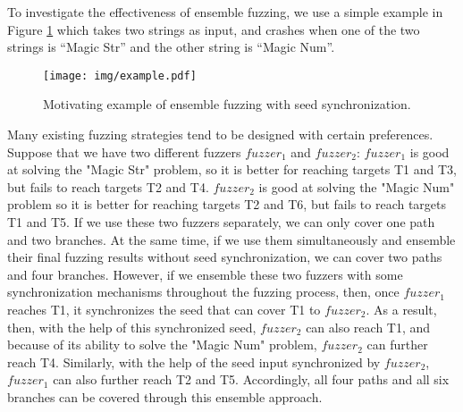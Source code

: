 To investigate the effectiveness of ensemble fuzzing, we use a simple example in Figure \ref{fig:motivating example}
which takes two strings as input, and crashes when one of the two strings is ``Magic Str'' and the other string is ``Magic Num''.



\begin{figure}[!htb]
 \centering
 \texttt{[image: img/example.pdf]}
 \caption{Motivating example of ensemble fuzzing with seed synchronization.}
 \label{fig:motivating example}
\end{figure}





Many existing fuzzing strategies tend to be designed with certain preferences. %
Suppose that we have two different fuzzers \(fuzzer_1\) and \(fuzzer_2\): \(fuzzer_1\) is good at solving the "Magic Str" problem, so it is better for reaching targets T1 and T3, but fails to reach targets T2 and T4. \(fuzzer_2\) is good at solving the "Magic Num" problem so it is better for reaching targets T2 and T6, but fails to reach targets T1 and T5.
If we use these two fuzzers separately, we can only cover one path and two branches.
At the same time, if we use them simultaneously and ensemble their final fuzzing results without seed synchronization, we can cover two paths and four branches.
However, if we ensemble these two fuzzers with some synchronization mechanisms throughout the fuzzing process, then, once \(fuzzer_1\) reaches T1, it synchronizes the seed that can cover T1 to \(fuzzer_2\). As a result, then, with the help of this synchronized seed, \(fuzzer_2\) can also reach T1, and because of its ability to  solve the "Magic Num" problem, \(fuzzer_2\) can further reach T4. Similarly, with the help of the seed input synchronized by \(fuzzer_2\), \(fuzzer_1\) can also further reach T2 and T5.
Accordingly, all four paths and all six branches can be covered through this ensemble approach.


